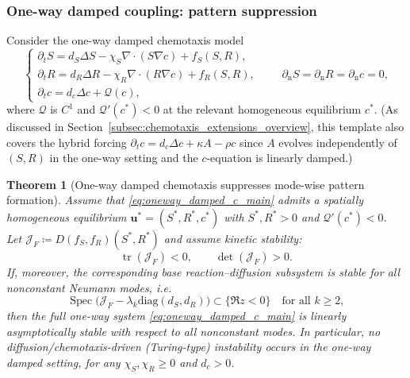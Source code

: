 \documentclass[pdflatex,sn-mathphys-ay]{sn-jnl}
\theoremstyle{thmstyleone}
\newtheorem{theorem}{Theorem}[section]
\theoremstyle{definition}
\theoremstyle{remark}
\begin{document}
\subsubsection{One-way damped coupling: pattern suppression}
\label{subsubsec:main_oneway}

Consider the one-way damped chemotaxis model
\begin{equation}
\label{eq:oneway_damped_c_main}
\begin{cases}
\partial_t S = d_S\Delta S - \chi_S\nabla\cdot(S\nabla c) + f_S(S,R),\\[2pt]
\partial_t R = d_R\Delta R - \chi_R\nabla\cdot(R\nabla c) + f_R(S,R),\\[2pt]
\partial_t c = d_c\Delta c + \mathcal{Q}(c),
\end{cases}
\qquad \partial_{\mathrm n}S=\partial_{\mathrm n}R=\partial_{\mathrm n}c=0,
\end{equation}
where $\mathcal{Q}$ is $C^1$ and $\mathcal{Q}'(c^*)<0$ at the relevant homogeneous equilibrium $c^*$.
(As discussed in Section~\ref{subsec:chemotaxis_extensions_overview}, this template also covers the hybrid forcing
$\partial_t c=d_c\Delta c+\kappa A-\rho c$ since $A$ evolves independently of $(S,R)$ in the one-way setting and the $c$-equation
is linearly damped.)

\begin{theorem}[One-way damped chemotaxis suppresses mode-wise pattern formation]
\label{thm:oneway_suppression}
Assume that \eqref{eq:oneway_damped_c_main} admits a spatially homogeneous equilibrium
$\mathbf{u}^*=(S^*,R^*,c^*)$ with $S^*,R^*>0$ and $\mathcal{Q}'(c^*)<0$.
Let $\mathcal{J}_F\coloneqq D(f_S,f_R)(S^*,R^*)$ and assume kinetic stability:
\begin{equation}
\label{eq:kinetic_stability_oneway}
\operatorname{tr}(\mathcal{J}_F)<0,\qquad \det(\mathcal{J}_F)>0.
\end{equation}
If, moreover, the corresponding base reaction--diffusion subsystem is stable for all nonconstant Neumann modes, i.e.
\begin{equation}
\label{eq:RD_block_stable_assumption}
\operatorname{Spec}\bigl(\mathcal{J}_F-\lambda_k \mathrm{diag}(d_S,d_R)\bigr)\subset\{\Re z<0\}
\quad \text{for all }k\ge2,
\end{equation}
then the full one-way system \eqref{eq:oneway_damped_c_main} is linearly asymptotically stable with respect to all nonconstant modes.
In particular, no diffusion/chemotaxis-driven (Turing-type) instability occurs in the one-way damped setting, for any
$\chi_S,\chi_R\ge0$ and $d_c>0$.
\end{theorem}
\end{document}
